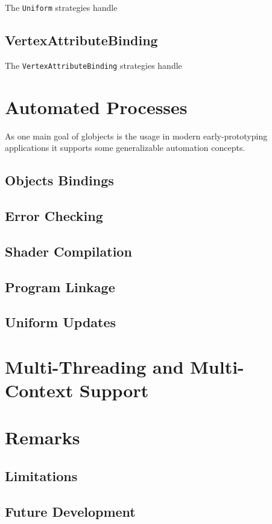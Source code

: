 \documentclass{article}
\begin{document}
The \lstinline|Uniform| strategies handle

\subsection{VertexAttributeBinding}

The \lstinline|VertexAttributeBinding| strategies handle

\section{Automated Processes}

As one main goal of globjects is the usage in modern early-prototyping applications it supports some generalizable automation concepts.

\subsection{Objects Bindings}



\subsection{Error Checking}



\subsection{Shader Compilation}

 

\subsection{Program Linkage}



\subsection{Uniform Updates}



\section{Multi-Threading and Multi-Context Support}


\section{Remarks}

\subsection{Limitations}

\subsection{Future Development}
\end{document}
